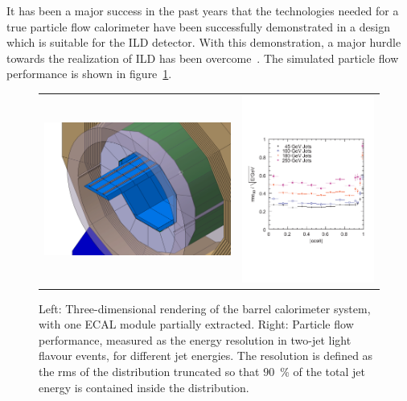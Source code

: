 \documentclass[%
 amsmath,amssymb,
 aps,
]{revtex4-1}
\begin{document}
It has been a major success in the past years that the technologies needed for a true particle flow calorimeter have been successfully demonstrated in a design which is suitable for the ILD detector. With this demonstration, a major hurdle towards the realization of ILD has been overcome~\cite{Sefkow:2018rhp}. The simulated particle flow performance is shown in figure~\ref{fig:pflow}.
\begin{figure}[th]
    \centering
    \begin{tabular}{lr}
    \includegraphics[width=0.45\hsize]{figures/ECal_insertion.jpg}&
    \includegraphics[width=0.4\hsize]{figures/pflow.pdf}\\
    \end{tabular}
    \caption{Left: Three-dimensional rendering of the barrel calorimeter system, with one ECAL module partially extracted. Right: Particle flow performance, measured as the energy resolution in two-jet light flavour events, for different jet energies. The resolution is defined as the rms of the distribution truncated so that $90$~\% of the total jet energy is contained inside the distribution.}
    \label{fig:pflow}
\end{figure}
\end{document}
